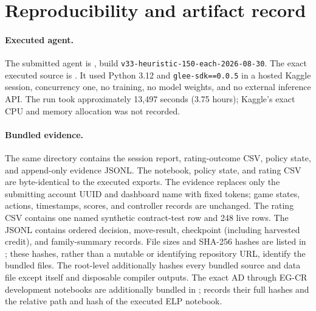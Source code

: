 \section{Reproducibility and artifact record}
\label{app:reproducibility}



\paragraph{Executed agent.}
The submitted agent is \AgentName{}, build
\texttt{v33-heuristic-150-each-2026-08-30}. The exact executed source is
.
It used Python 3.12 and \texttt{glee-sdk==0.0.5} in a hosted Kaggle session,
concurrency one, no training, no model weights, and no external inference API.
The run took approximately 13,497 seconds (3.75 hours); Kaggle's exact CPU and
memory allocation was not recorded.

\paragraph{Bundled evidence.}
The same directory contains the session report, rating-outcome CSV,
policy state, and append-only evidence JSONL. The notebook, policy state, and
rating CSV are byte-identical to the executed exports. The evidence replaces
only the submitting account UUID and dashboard name with fixed tokens; game
states, actions, timestamps, scores, and controller
records are unchanged. The rating CSV contains one named
synthetic contract-test row and 248 live rows. The JSONL contains ordered
decision, move-result, checkpoint (including harvested credit), and
family-summary records. File
sizes and SHA-256 hashes are listed in
; these hashes, rather than a
mutable or identifying repository URL, identify the bundled files. The
root-level  additionally hashes every bundled
source and data file except itself and disposable compiler outputs.
The exact AD through EG-CR development notebooks are additionally bundled in
;  records their full
hashes and the relative path and hash of the executed ELP notebook.

